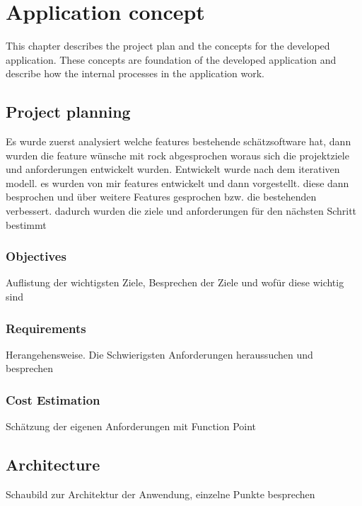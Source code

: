 \chapter{Application concept}

This chapter describes the project plan and the concepts for the developed application. These concepts are foundation of the developed application and describe how the internal processes in the application work.


\section{Project planning}



Es wurde zuerst analysiert welche features bestehende schätzsoftware hat, dann wurden die feature wünsche mit rock abgesprochen woraus sich die projektziele und anforderungen entwickelt wurden. Entwickelt wurde nach dem iterativen modell. es wurden von mir features entwickelt und dann vorgestellt. diese dann besprochen und über weitere Features gesprochen bzw. die bestehenden verbessert. dadurch wurden die ziele und anforderungen für den nächsten Schritt bestimmt


\subsection{Objectives}

Auflistung der wichtigsten Ziele, Besprechen der Ziele und wofür diese wichtig sind

\subsection{Requirements}

Herangehensweise. 
Die Schwierigsten Anforderungen heraussuchen und besprechen

\subsection{Cost Estimation}

Schätzung der eigenen Anforderungen mit Function Point

\section{Architecture}

Schaubild zur Architektur der Anwendung, einzelne Punkte besprechen

